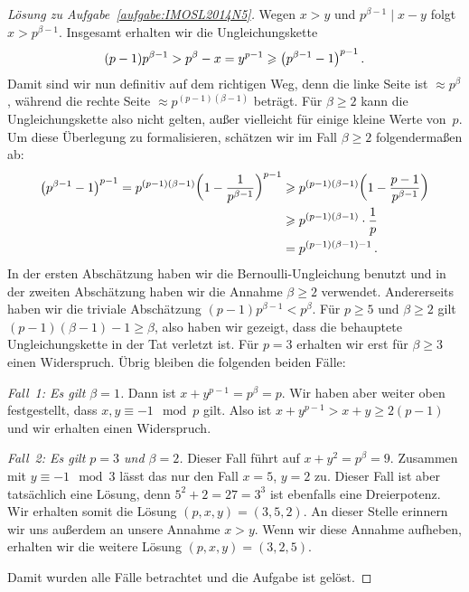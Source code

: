 \begin{proof}[Lösung zu Aufgabe~\ref{aufgabe:IMOSL2014N5}]
	Wegen $x>y$ und $p^{\beta-1}\mid x-y$ folgt $x>p^{\beta-1}$. Insgesamt erhalten wir die Ungleichungskette
	\begin{equation*}
		(p-1)p^{\beta-1}>p^\beta-x =y^{p-1}\geqslant \parens*{p^{\beta-1}-1}^{p-1}\,.
	\end{equation*}
	Damit sind wir nun definitiv auf dem richtigen Weg, denn die linke Seite ist $\approx p^\beta$, während die rechte Seite $\approx p^{(p-1)(\beta-1)}$ beträgt. Für $\beta\geqslant 2$ kann die Ungleichungskette also nicht gelten, außer vielleicht für einige kleine Werte von~$p$. Um diese Überlegung zu formalisieren, schätzen wir im Fall $\beta\geqslant 2$ folgendermaßen ab:
	\begin{align*}
		\parens*{p^{\beta-1}-1}^{p-1}=p^{(p-1)(\beta-1)}\parens*{1-\frac{1}{p^{\beta-1}}}^{p-1}&\geqslant p^{(p-1)(\beta-1)}\parens*{1-\frac{p-1}{p^{\beta-1}}}\\
		&\geqslant p^{(p-1)(\beta-1)}\cdot \frac 1p\\
		&=p^{(p-1)(\beta-1)-1}\,.
	\end{align*}
	In der ersten Abschätzung haben wir die Bernoulli-Ungleichung benutzt und in der zweiten Abschätzung haben wir die Annahme $\beta\geqslant 2$ verwendet. Andererseits haben wir die triviale Abschätzung $(p-1)p^{\beta-1}<p^\beta$. Für $p\geqslant 5$ und $\beta\geqslant 2$ gilt $(p-1)(\beta-1)-1\geqslant \beta$, also haben wir gezeigt, dass die behauptete Ungleichungskette in der Tat verletzt ist. Für $p=3$ erhalten wir erst für $\beta\geqslant 3$ einen Widerspruch. Übrig bleiben die folgenden beiden Fälle:
	
	\emph{Fall~1: Es gilt $\beta=1$.} Dann ist $x+y^{p-1}=p^\beta=p$. Wir haben aber weiter oben festgestellt, dass $x,y\equiv -1\mod p$ gilt. Also ist $x+y^{p-1}>x+y\geqslant 2(p-1)$ und wir erhalten einen Widerspruch.
	
	\emph{Fall~2: Es gilt $p=3$ und $\beta=2$.} Dieser Fall führt auf $x+y^2=p^\beta=9$. Zusammen mit $y\equiv -1\mod 3$ lässt das nur den Fall $x=5$, $y=2$ zu. Dieser Fall ist aber tatsächlich eine Lösung, denn $5^2+2=27=3^3$ ist ebenfalls eine Dreierpotenz. Wir erhalten somit die Lösung $(p,x,y)=(3,5,2)$. An dieser Stelle erinnern wir uns außerdem an unsere Annahme $x>y$. Wenn wir diese Annahme aufheben, erhalten wir die weitere Lösung $(p,x,y)=(3,2,5)$.
	
	Damit wurden alle Fälle betrachtet und die Aufgabe ist gelöst.
\end{proof}